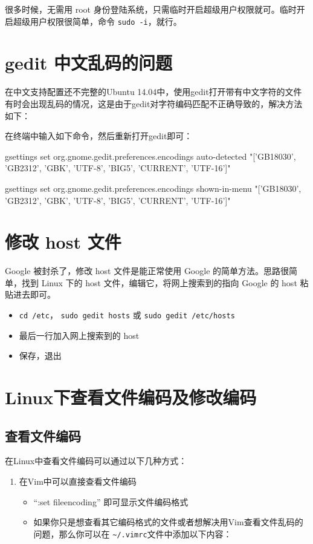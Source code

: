 {很多时候，无需用 root 身份登陆系统，只需临时开启超级用户权限就可。临时开启超级用户权限很简单，命令 \verb*|sudo -i|，就行。



\section{gedit 中文乱码的问题}
在中文支持配置还不完整的Ubuntu 14.04中，使用gedit打开带有中文字符的文件有时会出现乱码的情况，这是由于gedit对字符编码匹配不正确导致的，解决方法如下：

在终端中输入如下命令，然后重新打开gedit即可：

    gsettings set org.gnome.gedit.preferences.encodings auto-detected "['GB18030', 'GB2312', 'GBK', 'UTF-8', 'BIG5', 'CURRENT', 'UTF-16']"

    gsettings set org.gnome.gedit.preferences.encodings shown-in-menu "['GB18030', 'GB2312', 'GBK', 'UTF-8', 'BIG5', 'CURRENT', 'UTF-16']"



\section{修改 host 文件}
Google 被封杀了，修改 host 文件是能正常使用 Google 的简单方法。思路很简单，找到 Linux 下的 host 文件，编辑它，将网上搜索到的指向 Google 的 host 粘贴进去即可。
\begin{itemize}
\item \verb*|cd /etc|， \verb*|sudo gedit hosts| 或 \verb*|sudo gedit /etc/hosts|
\item 最后一行加入网上搜索到的 host
\item 保存，退出
\end{itemize}



\section{Linux下查看文件编码及修改编码}
\subsection{查看文件编码}
在Linux中查看文件编码可以通过以下几种方式：
\begin{enumerate}
\item 在Vim中可以直接查看文件编码
\begin{itemize}
\item ``:set fileencoding'' 即可显示文件编码格式
\item 如果你只是想查看其它编码格式的文件或者想解决用Vim查看文件乱码的问题，那么你可以在
\verb|~/.vimrc|文件中添加以下内容：


\end{itemize}
\end{enumerate}}
